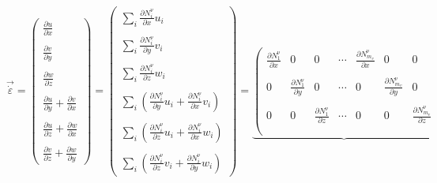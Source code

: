 \begin{equation}
\vec{\dot\varepsilon}=
\left(
\begin{array}{c}
\frac{\partial u}{\partial x} \\ \\
\frac{\partial v}{\partial y} \\ \\
\frac{\partial w}{\partial z} \\ \\
\frac{\partial u}{\partial y}\! +\! \frac{\partial v}{\partial x} \\ \\
\frac{\partial u}{\partial z}\! +\! \frac{\partial w}{\partial x} \\ \\
\frac{\partial v}{\partial z}\! +\! \frac{\partial w}{\partial y} 
\end{array}
\right)
=
\left(
\begin{array}{c}
\sum\limits_i \frac{\partial N_i^\upnu}{\partial x} u_i \\ \\
\sum\limits_i \frac{\partial N_i^\upnu}{\partial y} v_i \\ \\
\sum\limits_i \frac{\partial N_i^\upnu}{\partial z} w_i \\ \\
\sum\limits_i (\frac{\partial N_i^\upnu}{\partial y} u_i\! +\! \frac{\partial N_i^\upnu}{\partial x} v_i) \\ \\
\sum\limits_i (\frac{\partial N_i^\upnu}{\partial z} u_i\! +\! \frac{\partial N_i^\upnu}{\partial x} w_i) \\ \\
\sum\limits_i (\frac{\partial N_i^\upnu}{\partial z} v_i\! +\! \frac{\partial N_i^\upnu}{\partial y} w_i) 
\end{array}
\right)
=
\underbrace{
\left(
\begin{array}{ccccccccccc}
\frac{\partial N_1^\upnu}{\partial x} & 0 & 0 &  \cdots  & \frac{\partial N_{m_v}^\upnu}{\partial x} & 0 & 0 \\ \\
0 & \frac{\partial N_1^\upnu}{\partial y} & 0 & \cdots & 0 & \frac{\partial N_{m_v}^\upnu}{\partial y} & 0 \\ \\
0 & 0 & \frac{\partial N_1^\upnu}{\partial z} & \cdots & 0 & 0 & \frac{\partial N_{m_v}^\upnu}{\partial z} 
\\ \\

\end{array}}
\end{equation}
